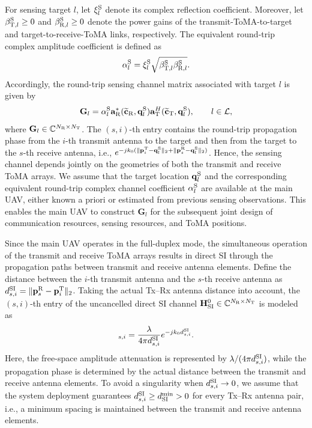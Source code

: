 \documentclass[letterpaper,journal]{IEEEtran}
\begin{document}
For sensing target $l$, let $\xi_l^{\rm S}$ denote its complex reflection coefficient. Moreover, let $\beta_{{\rm T},l}^{\rm S}\ge0$ and $\beta_{{\rm R},l}^{\rm S}\ge0$ denote the power gains of the transmit-ToMA-to-target and target-to-receive-ToMA links, respectively. The equivalent round-trip complex amplitude coefficient is defined as
\begin{equation}
\alpha_l^{\rm S}
=
\xi_l^{\rm S}
\sqrt{
\beta_{{\rm T},l}^{\rm S}
\beta_{{\rm R},l}^{\rm S}
}.
\label{eq:round_trip_coeff}
\end{equation}
Accordingly, the round-trip sensing channel matrix associated with target $l$ is given by
\begin{equation}
\mathbf G_l
=
\alpha_l^{\rm S}
\mathbf a_{\rm R}^{*}
(\widetilde{\mathbf c}_{\rm R},\mathbf q_l^{\rm S})
\mathbf a_{\rm T}^{H}
(\widetilde{\mathbf c}_{\rm T},\mathbf q_l^{\rm S}),
\qquad
l\in\mathcal L,
\label{eq:sensing_channel}
\end{equation}
where $\mathbf G_l\in\mathbb C^{N_{\rm R}\times N_{\rm T}}$. The $(s,i)$-th entry contains the round-trip propagation phase from the $i$-th transmit antenna to the target and then from the target to the $s$-th receive antenna, i.e., $e^{-j k_0(\|\mathbf p_i^{\rm T}-\mathbf q_l^{\rm S}\|_2+\|\mathbf p_s^{\rm R}-\mathbf q_l^{\rm S}\|_2)}$. Hence, the sensing channel depends jointly on the geometries of both the transmit and receive ToMA arrays. We assume that the target location $\mathbf q_l^{\rm S}$ and the corresponding equivalent round-trip complex channel coefficient $\alpha_l^{\rm S}$ are available at the main UAV, either known a priori or estimated from previous sensing observations. This enables the main UAV to construct $\mathbf G_l$ for the subsequent joint design of communication resources, sensing resources, and ToMA positions.

Since the main UAV operates in the full-duplex mode, the simultaneous operation of the transmit and receive ToMA arrays results in direct SI through the propagation paths between transmit and receive antenna elements. Define the distance between the $i$-th transmit antenna and the $s$-th receive antenna as $d_{s,i}^{\rm SI}=\|\mathbf p_s^{\rm R}-\mathbf p_i^{\rm T}\|_2$. Taking the actual Tx--Rx antenna distance into account, the $(s,i)$-th entry of the uncancelled direct SI channel $\mathbf H_{\rm SI}^{0}\in\mathbb C^{N_{\rm R}\times N_{\rm T}}$ is modeled as
\begin{equation}
[\mathbf H_{\rm SI}^{0}]_{s,i}
=
\frac{\lambda}{4\pi d_{s,i}^{\rm SI}}
e^{-j k_0d_{s,i}^{\rm SI}}.
\label{eq:direct_si_channel}
\end{equation}
Here, the free-space amplitude attenuation is represented by $\lambda/(4\pi d_{s,i}^{\rm SI})$, while the propagation phase is determined by the actual distance between the transmit and receive antenna elements. To avoid a singularity when $d_{s,i}^{\rm SI}\rightarrow0$, we assume that the system deployment guarantees $d_{s,i}^{\rm SI}\ge d_{\rm SI}^{\min}>0$ for every Tx--Rx antenna pair, i.e., a minimum spacing is maintained between the transmit and receive antenna elements.
\end{document}
